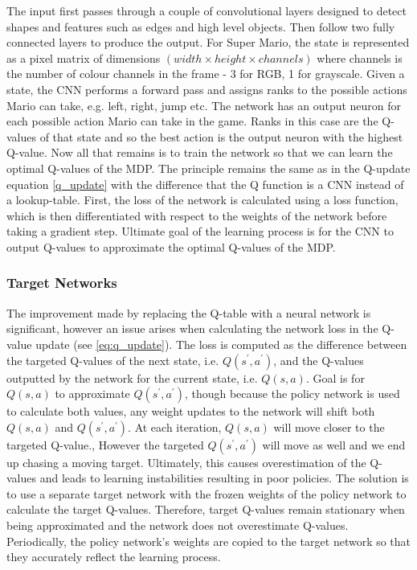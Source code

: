 \documentclass[notitlepage,a4paper,11pt]{article}
\begin{document}
The input first passes through a couple of convolutional layers designed to detect shapes and features such as edges and high level objects. Then follow two fully connected layers to produce the output. For Super Mario, the state is represented as a pixel matrix of dimensions $(width \times height \times channels)$ where channels is the number of colour channels in the frame - 3 for RGB, 1 for grayscale. Given a state, the CNN performs a forward pass and assigns ranks to the possible actions Mario can take, e.g. left, right, jump etc. The network has an output neuron for each possible action Mario can take in the game. Ranks in this case are the Q-values of that state and so the best action is the output neuron with the highest Q-value. Now all that remains is to train the network so that we can learn the optimal Q-values of the MDP. The principle remains the same as in the Q-update equation \ref{q_update} with the difference that the Q function is a CNN instead of a lookup-table. First, the loss of the network is calculated using a loss function, which is then differentiated with respect to the weights of the network before taking a gradient step. Ultimate goal of the learning process is for the CNN to output Q-values to approximate the optimal Q-values of the MDP. 

\subsubsection{Target Networks}
The improvement made by replacing the Q-table with a neural network is significant, however an issue arises when calculating the network loss in the Q-value update (see \ref{eq:q_update}). The loss is computed as the difference between the targeted Q-values of the next state, i.e. $Q(s^\prime, a^\prime)$, and the Q-values outputted by the network for the current state, i.e. $Q(s,a)$. Goal is for $Q(s,a)$ to approximate $Q(s^\prime, a^\prime)$, though because the policy network is used to calculate both values, any weight updates to the network will shift both $Q(s,a)$ and $Q(s^\prime, a^\prime)$. At each iteration, $Q(s,a)$ will move closer to the targeted Q-value., However the targeted $Q(s^\prime, a^\prime)$ will move as well and we end up chasing a moving target. Ultimately, this causes overestimation of the Q-values and leads to learning instabilities resulting in poor policies. The solution is to use a separate target network with the frozen weights of the policy network to calculate the target Q-values. Therefore, target Q-values remain stationary when being approximated and the network does not overestimate Q-values. Periodically, the policy network's weights are copied to the target network so that they accurately reflect the learning process.
\end{document}
